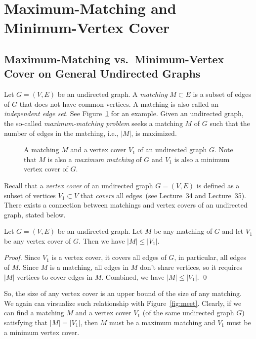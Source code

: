 \section{Maximum-Matching and Minimum-Vertex Cover}

\subsection*{Maximum-Matching vs.\ Minimum-Vertex Cover on General Undirected Graphs}

Let $G = (V, E)$ be an undirected graph. A \emph{matching} $M \subset E$ 
is a subset of edges of $G$ that does not have common vertices.
A matching is also called an \emph{independent edge set}.
See Figure~\ref{fig:matching} for an example.
Given an undirected graph, the so-called \emph{maximum-matching problem}
seeks a matching $M$ of $G$ such that the number of edges in the matching, i.e., $|M|$, 
is maximized.

\begin{figure}[h]
\centering{}
\caption{A matching $M$ and a vertex cover $V_1$ of an undirected graph $G$. 
Note that $M$ is also a \emph{maximum matching} of $G$ and $V_1$ is also a minimum vertex cover of $G$.}
\label{fig:matching}
\end{figure}

Recall that a \emph{vertex cover} of an undirected graph $G = (V, E)$ is defined
as a subset of vertices $V_1\subset V$ that \emph{covers} all edges~(see Lecture~34 and Lecture~35).
There exists a connection between matchings and vertex covers of an undirected graph, stated below.

\begin{claim}
Let $G = (V, E)$ be an undirected graph. Let $M$ be any matching of $G$ and let $V_1$ be any vertex cover of $G$.
Then we have $|M| \le |V_1|$.
\end{claim}

\emph{Proof.} Since $V_1$ is a vertex cover, it covers all edges of $G$, in particular, all edges of $M$.
Since $M$ is a matching, all edges in $M$ don't share vertices, so it requires $|M|$ vertices to cover edges in $M$.
Combined, we have $|M| \le |V_1|$. \qed

So, the size of any vertex cover is an upper bound of the size of any matching. We again can virsualize
such relationship with Figure~\ref{fig:meet}. Clearly, if we can find a matching $M$ and a vertex cover $V_1$
(of the same undirected graph $G$) satisfying that $|M| = |V_1|$, then $M$ must be a maximum matching 
and $V_1$ must be a minimum vertex cover.

